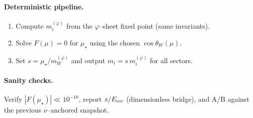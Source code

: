 \documentclass[11pt]{article}
\begin{document}
\paragraph{Deterministic pipeline.}
\begin{enumerate}
  \item Compute $m_i^{(\varphi)}$ from the $\varphi$--sheet fixed point (same invariants).
  \item Solve $F(\mu)=0$ for $\mu_\star$ using the chosen $\cos\theta_W(\mu)$.
  \item Set $s=\mu_\star/m_W^{(\varphi)}$ and output $m_i = s\,m_i^{(\varphi)}$ for all sectors.
\end{enumerate}

\paragraph{Sanity checks.} Verify $|F(\mu_\star)|\ll 10^{-10}$, report $s/E_{\rm rec}$ (dimensionless bridge), and A/B against the previous $\nu$--anchored snapshot.
\end{document}
